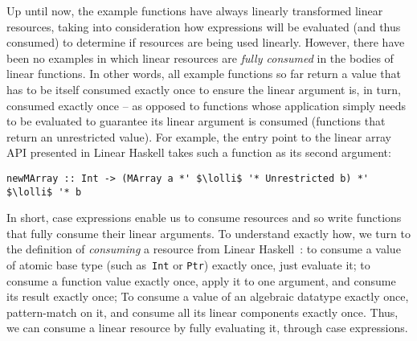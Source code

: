 \documentclass[acmsmall,review]{acmart}
\newcommand{\lolli}{\multimap}
\newcommand{\tensor}{\otimes}
\begin{document}
Up until now, the example functions have always linearly transformed linear
resources, taking into consideration how expressions will be evaluated (and thus
consumed) to determine if resources are being used linearly. However, there
have been no examples in which linear resources are \emph{fully consumed} in
the bodies of linear functions. In other words, all example functions so far
return a value that has to be itself consumed exactly once to ensure the linear
argument is, in turn, consumed exactly once -- as opposed to functions whose
application simply needs to be evaluated to guarantee its linear argument is
consumed (functions that return an unrestricted value).
%
%
For example, the entry point to the linear array API presented in Linear
Haskell takes such a function as its second argument:
\begin{working}
\begin{lstlisting}
newMArray :: Int -> (MArray a *' $\lolli$ '* Unrestricted b) *' $\lolli$ '* b
\end{lstlisting}
\end{working}


In short, case expressions enable us to consume resources and so write
functions that fully consume their linear arguments. To understand exactly how,
we turn to the definition of \emph{consuming} a resource from Linear
Haskell~\cite{cite:linearhaskell}:
to consume a value of atomic base type (such as~\texttt{Int} or
        \texttt{Ptr}) exactly once, just evaluate it;
        to consume a function value exactly once, apply it to one argument,
        and consume its result exactly once;
        To consume a value of an algebraic datatype exactly once,
        pattern-match on it, and consume all its linear components exactly once.
Thus, we can consume a linear resource by fully evaluating it, through case
expressions.
\end{document}
